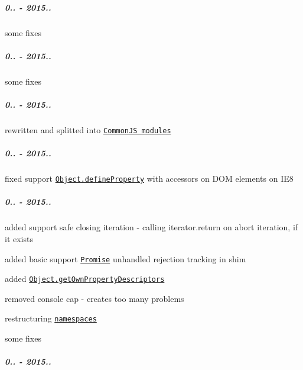 \subparagraph*{0.. -\/ 2015..}


\begin{DoxyItemize}
\item some fixes
\end{DoxyItemize}

\subparagraph*{0.. -\/ 2015..}


\begin{DoxyItemize}
\item some fixes
\end{DoxyItemize}

\subparagraph*{0.. -\/ 2015..}


\begin{DoxyItemize}
\item rewritten and splitted into \href{https://github.com/zloirock/core-js/#commonjs}{\tt Common\+JS modules}
\end{DoxyItemize}

\subparagraph*{0.. -\/ 2015..}


\begin{DoxyItemize}
\item fixed support \href{https://github.com/zloirock/core-js/#ecmascript-5}{\tt {\ttfamily Object.\+define\+Property}} with accessors on D\+OM elements on I\+E8
\end{DoxyItemize}

\subparagraph*{0.. -\/ 2015..}


\begin{DoxyItemize}
\item added support safe closing iteration -\/ calling {\ttfamily iterator.\+return} on abort iteration, if it exists
\item added basic support \href{https://github.com/zloirock/core-js/#ecmascript-6-promise}{\tt {\ttfamily Promise}} unhandled rejection tracking in shim
\item added \href{https://github.com/zloirock/core-js/#ecmascript-7-proposals}{\tt {\ttfamily Object.\+get\+Own\+Property\+Descriptors}}
\item removed {\ttfamily console} cap -\/ creates too many problems
\item restructuring \href{https://github.com/zloirock/core-js/#custom-build}{\tt namespaces}
\item some fixes
\end{DoxyItemize}

\subparagraph*{0.. -\/ 2015..}


